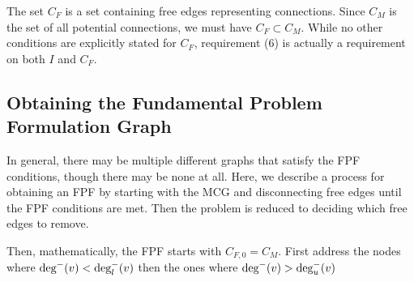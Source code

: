 The set $C_F$ is a set containing free edges representing connections. Since $C_M$ is the set of all potential connections, we must have $C_F \subset C_M$. While no other conditions are explicitly stated for $C_F$, requirement (6) is actually a requirement on both $I$ and $C_F$.

\subsection{Obtaining the Fundamental Problem Formulation Graph}
In general, there may be multiple different graphs that satisfy the FPF conditions, though there may be none at all. Here, we describe a process for obtaining an FPF by starting with the MCG and disconnecting free edges until the FPF conditions are met. Then the problem is reduced to deciding which free edges to remove.

Then, mathematically, the FPF starts with $C_{F,0} = C_M$.
First address the nodes where $\textrm{deg}^-(v) < \textrm{deg}_l^-(v)$ then the ones where $\textrm{deg}^-(v) > \textrm{deg}_u^-(v)$

